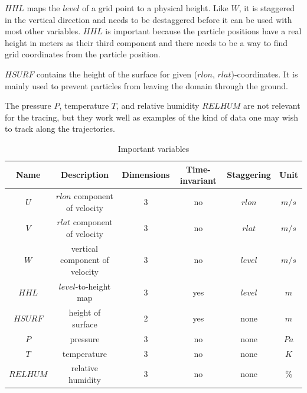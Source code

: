 $HHL$ maps the $level$ of a grid point to a physical height. Like $W$, it is staggered in the vertical direction and needs to be destaggered before it can be used with most other variables. $HHL$ is important because the particle positions have a real height in meters as their third component and there needs to be a way to find grid coordinates from the particle position.

$HSURF$ contains the height of the surface for given ($rlon$, $rlat$)-coordinates. It is mainly used to prevent particles from leaving the domain through the ground.

The pressure $P$, temperature $T$, and relative humidity $RELHUM$ are not relevant for the tracing, but they work well as examples of the kind of data one may wish to track along the trajectories.

\begin{table}
\centering
\begin{tabular}{|c|c|c|c|c|c|}
\hline
Name & Description & Dimensions & Time-invariant & Staggering & Unit \\ \hline
$U$ & $rlon$ component of velocity & 3 & no & $rlon$ & $m/s$ \\ \hline
$V$ & $rlat$ component of velocity & 3 & no & $rlat$ & $m/s$ \\ \hline
$W$ & vertical component of velocity & 3 & no & $level$ & $m/s$ \\ \hline
$HHL$ & $level$-to-height map & 3 & yes & $level$ & $m$ \\ \hline
$HSURF$ & height of surface & 2 & yes & none & $m$ \\ \hline
$P$ & pressure & 3 & no & none & $Pa$ \\ \hline
$T$ & temperature & 3 & no & none & $K$ \\ \hline
$RELHUM$ & relative humidity & 3 & no & none & \% \\ \hline
\end{tabular}
\caption{Important variables}
\label{tab:variables}
\end{table}


